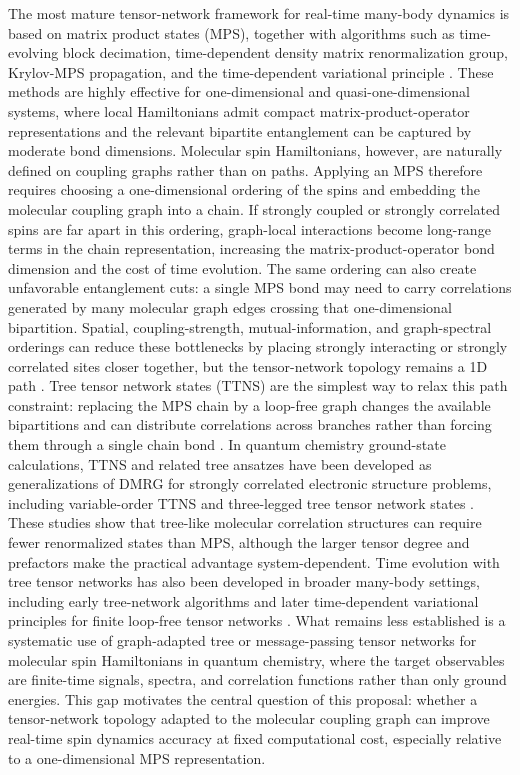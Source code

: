 \documentclass[12pt]{article}
\begin{document}
The most mature tensor-network framework for real-time many-body dynamics is based on matrix product states (MPS), together with algorithms such as time-evolving block decimation, time-dependent density matrix renormalization group, Krylov-MPS propagation, and the time-dependent variational principle \cite{Schollwock2011DMRGMPS,Paeckel2019MpsTimeEvolution}.
These methods are highly effective for one-dimensional and quasi-one-dimensional systems, where local Hamiltonians admit compact matrix-product-operator representations and the relevant bipartite entanglement can be captured by moderate bond dimensions.
Molecular spin Hamiltonians, however, are naturally defined on coupling graphs rather than on paths.
Applying an MPS therefore requires choosing a one-dimensional ordering of the spins and embedding the molecular coupling graph into a chain.
If strongly coupled or strongly correlated spins are far apart in this ordering, graph-local interactions become long-range terms in the chain representation, increasing the matrix-product-operator bond dimension and the cost of time evolution.
The same ordering can also create unfavorable entanglement cuts: a single MPS bond may need to carry correlations generated by many molecular graph edges crossing that one-dimensional bipartition.
Spatial, coupling-strength, mutual-information, and graph-spectral orderings can reduce these bottlenecks by placing strongly interacting or strongly correlated sites closer together, but the tensor-network topology remains a 1D path \cite{Legeza2003OptimizingDMRGOrdering}.
Tree tensor network states (TTNS) are the simplest way to relax this path constraint: replacing the MPS chain by a loop-free graph changes the available bipartitions and can distribute correlations across branches rather than forcing them through a single chain bond \cite{nakataniEfficientTreeTensor2013}.
In quantum chemistry ground-state calculations, TTNS and related tree ansatzes have been developed as generalizations of DMRG for strongly correlated electronic structure problems, including variable-order TTNS and three-legged tree tensor network states \cite{nakataniEfficientTreeTensor2013,Murg2015VariableOrderTTNS,Gunst2018T3NS}.
These studies show that tree-like molecular correlation structures can require fewer renormalized states than MPS, although the larger tensor degree and prefactors make the practical advantage system-dependent.
Time evolution with tree tensor networks has also been developed in broader many-body settings, including early tree-network algorithms and later time-dependent variational principles for finite loop-free tensor networks \cite{Shi2006Classical,Bauernfeind2020TDVPTTNS}.
What remains less established is a systematic use of graph-adapted tree or message-passing tensor networks for molecular spin Hamiltonians in quantum chemistry, where the target observables are finite-time signals, spectra, and correlation functions rather than only ground energies.
This gap motivates the central question of this proposal: whether a tensor-network topology adapted to the molecular coupling graph can improve real-time spin dynamics accuracy at fixed computational cost, especially relative to a one-dimensional MPS representation.
\end{document}

